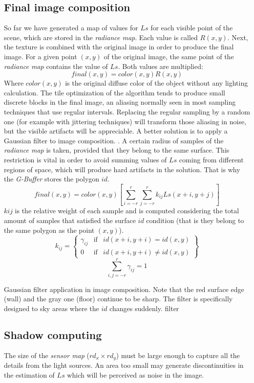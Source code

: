 \documentclass[10pt, conference]{IEEEtran}
\begin{document}
\subsection{Final image composition}
So far we have generated a map of values for $Ls$ for each visible point of the scene, which are stored in the \emph{radiance map}. 
Each value is called $R(x, y)$. Next, the texture is combined with the original image in order to produce the final image. 
For a given point $(x,y)$ of the original image, the same point of the \emph{radiance map} contains the value of $Ls$. Both values are multiplied:
\[
	final(x,y) = color(x,y)R(x, y)
\]
Where $color(x,y)$ is the original diffuse color of the object without any lighting calculation.
The tile optimization of the algorithm tends to produce small discrete blocks in the final image, an aliasing normally seen in most sampling techniques that use regular intervals. 
Replacing the regular sampling by a random one (for example with jittering techniques) will transform those aliasing in noise, but the visible artifacts will be appreciable. 
A better solution is to apply a Gaussian filter \cite{gauss_filter} to image composition. . 
A certain radius of samples of the \emph{radiance map} is taken, provided that they belong to the same surface. 
This restriction is vital in order to avoid summing values of $Ls$ coming from different regions of space, which will produce hard artifacts in the solution. 
That is why the \emph{G-Buffer} stores the polygon $id$.
\[
	final(x,y) = color(x,y)[ \sum_{i=-r}^r{ \sum_{j=-r}^r{k_{ij}Ls(x+i,y+j)}}]
\]
$kij$ is the relative weight of each sample and is computed considering the total amount of samples that satisfied the surface $id$ condition (that is they belong to the same polygon as the point $(x, y)$).
\[
	k_{ij}=
		\begin{Bmatrix}
			\gamma_{ij} & \mbox{if}& id(x+i,y+i) = id(x,y)\\
			0 & \mbox{if} & id(x+i,y+i) \neq id(x,y)
		\end{Bmatrix}
\]
\[
	\sum_{i,j=-r}^r \gamma_{ij} = 1
\]

\subimages
	{Gaussian filter application in image composition. Note that the red surface edge (wall) and the gray one (floor) continue to be sharp. 
	The filter is specifically designed to sky areas where the $id$ changes suddenly.}
	{filter}{
}

\subsection{Shadow computing}
The size of the \emph{sensor map} ($rd_x \times rd_y$) must be large enough to capture all the details from the light sources. 
An area too small may generate discontinuities in the estimation of $Ls$ which will be perceived as noise in the image.\
\end{document}
